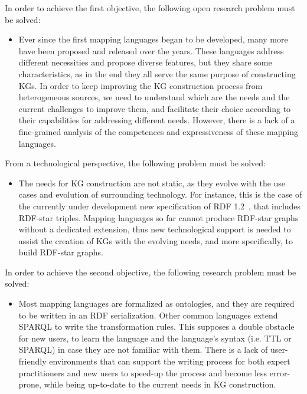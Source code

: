 In order to achieve the first objective, the following open research problem must be solved:
\begin{itemize}
    \item Ever since the first mapping languages began to be developed, many more have been proposed and released over the years. These languages address different necessities and propose diverse features, but they share some characteristics, as in the end they all serve the same purpose of constructing KGs. In order to keep improving the KG construction process from heterogeneous sources, we need to understand which are the needs and the current challenges to improve them, and facilitate their choice according to their capabilities for addressing different needs. However, there is a lack of a fine-grained analysis of the competences and expressiveness of these mapping languages. %
\end{itemize}

From a technological perspective, the following problem must be solved:
\begin{itemize}
    \item The needs for KG construction are not static, as they evolve with the use cases and evolution of surrounding technology. For instance, this is the case of the currently under development new specification of RDF 1.2~\cite{hartig2023rdf}, that includes RDF-star triples. Mapping languages so far cannot produce RDF-star graphs without a dedicated extension, thus new technological support is needed to assist the creation of KGs with the evolving needs, and more specifically, to build RDF-star graphs. 
\end{itemize}

In order to achieve the second objective, the following research problem must be solved:
\begin{itemize}
    \item Most mapping languages are formalized as ontologies, and they are required to be written in an RDF serialization. Other common languages extend SPARQL to write the transformation rules. This supposes a double obstacle for new users, to learn the language and the language's syntax (i.e. TTL or SPARQL) in case they are not familiar with them. There is a lack of user-friendly environments that can support the writing process for both expert practitioners and new users to speed-up the process and become less error-prone, while being up-to-date to the current needs in KG construction.
\end{itemize}


